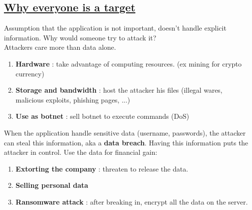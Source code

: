 \documentclass[titlepage]{article}
\begin{document}
    \subsection{\href{https://youtu.be/XkQDwKM1HN0}{Why everyone is a target}}
    Assumption that the application is not important, doesn't handle explicit information. Why would someone try to attack it? \\
    Attackers care more than data alone. 
    \begin{enumerate}
        \item \textbf{Hardware} : take advantage of computing resources. (ex mining for crypto currency)
        \item \textbf{Storage and bandwidth} : host the attacker his files (illegal wares, malicious exploits, phishing pages, ...)
        \item \textbf{Use as botnet} : sell botnet to execute commands (DoS)
    \end{enumerate}
    When the application handle sensitive data (username, passwords), the attacker can steal this information, aka a \textbf{data breach}. Having this information puts the attacker in control.
    Use the data for financial gain:
    \begin{enumerate}
        \item \textbf{Extorting the company} : threaten to release the data.
        \item \textbf{Selling personal data}
        \item \textbf{Ransomware attack} : after breaking in, encrypt all the data on the server.
    \end{enumerate}
\end{document}
